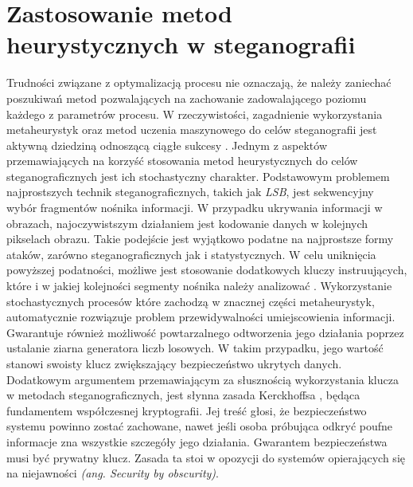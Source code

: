 {    %
    \section{Zastosowanie metod heurystycznych w steganografii}\label{sec:heuristics-ants}
    {
        Trudności związane z optymalizacją procesu nie oznaczają, że należy zaniechać poszukiwań metod pozwalających na
        zachowanie zadowalającego poziomu każdego z parametrów procesu. W rzeczywistości, zagadnienie wykorzystania
        metaheurystyk oraz metod uczenia maszynowego do celów steganografii jest aktywną dziedziną odnoszącą ciągłe
        sukcesy \cite{ElEmam2013NewSA, Zhao2021AntCO, Khan2018AntCO, Saleema2016ANS, Li2007ASM}.
        Jednym z aspektów przemawiających na korzyść stosowania metod heurystycznych do celów steganograficznych jest
        ich stochastyczny charakter. Podstawowym problemem najprostszych technik steganograficznych, takich jak
        \textit{LSB}, jest sekwencyjny wybór fragmentów nośnika informacji. W przypadku ukrywania informacji w
        obrazach, najoczywistszym działaniem jest kodowanie danych w kolejnych pikselach obrazu. Takie podejście jest
        wyjątkowo podatne na najprostsze formy ataków, zarówno steganograficznych jak i statystycznych. W celu
        uniknięcia powyższej podatności, możliwe jest stosowanie dodatkowych kluczy instruujących, które i w jakiej
        kolejności segmenty nośnika należy analizować \cite{AlHusainy2019ASI}. Wykorzystanie stochastycznych procesów
        które zachodzą w znacznej części metaheurystyk, automatycznie rozwiązuje problem przewidywalności umiejscowienia
        informacji. Gwarantuje również możliwość powtarzalnego odtworzenia jego działania poprzez ustalanie ziarna
        generatora liczb losowych. W takim przypadku, jego wartość stanowi swoisty klucz zwiększający bezpieczeństwo
        ukrytych danych.
        Dodatkowym argumentem przemawiającym za słusznością wykorzystania klucza w metodach steganograficznych, jest
        słynna zasada Kerckhoffsa \cite{Guillot2013AugusteKE}, będąca fundamentem współczesnej kryptografii. Jej treść
        głosi, że bezpieczeństwo systemu powinno zostać zachowane, nawet jeśli osoba próbująca odkryć poufne informacje
        zna wszystkie szczegóły jego działania. Gwarantem bezpieczeństwa musi być prywatny klucz. Zasada ta stoi w
        opozycji do systemów opierających się na niejawności \textit{(ang. Security by obscurity)}.

}}
